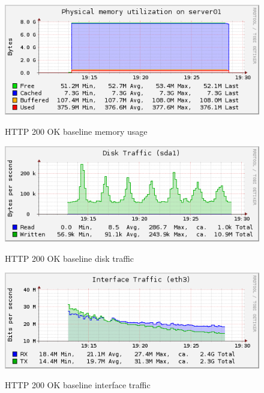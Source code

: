 \documentclass[Measurement results]{subfiles}
\begin{document}
\begin{figure}[H]
\centering
\caption{HTTP 200 OK baseline memory usage}
\includegraphics[scale=0.7]{images/results/200_with_naxsi_incremented_disallowed_parameters/memory.png}
\label{fig:Baseline Nginx memory usage}
\end{figure}

\begin{figure}[H]
\centering
\caption{HTTP 200 OK baseline disk traffic}
\includegraphics[scale=0.7]{images/results/200_with_naxsi_incremented_disallowed_parameters/disk.png}
\label{fig:Baseline Nginx disk traffic}
\end{figure}

\begin{figure}[H]
\centering
\caption{HTTP 200 OK baseline interface traffic}
\includegraphics[scale=0.7]{images/results/200_with_naxsi_incremented_disallowed_parameters/interface.png}
\label{fig:Baseline Nginx interface traffic}
\end{figure}
\end{document}
